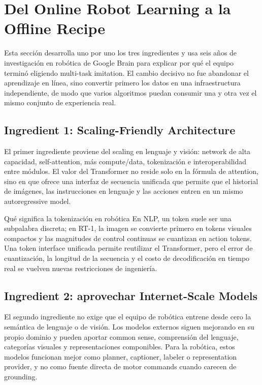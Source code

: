\section{Del Online Robot Learning a la Offline Recipe}

Esta sección desarrolla uno por uno los tres ingredientes y usa seis años de investigación en robótica de Google Brain para explicar por qué el equipo terminó eligiendo multi-task imitation. El cambio decisivo no fue abandonar el aprendizaje en línea, sino convertir primero los datos en una infraestructura independiente, de modo que varios algoritmos puedan consumir una y otra vez el mismo conjunto de experiencia real.

\subsection{Ingredient 1: Scaling-Friendly Architecture}

El primer ingrediente proviene del scaling en lenguaje y visión: network de alta capacidad, self-attention, más compute/data, tokenización e interoperabilidad entre módulos. El valor del Transformer no reside solo en la fórmula de attention, sino en que ofrece una interfaz de secuencia unificada que permite que el historial de imágenes, las instrucciones en lenguaje y las acciones entren en un mismo autoregressive model.


\begin{knowledgebox}{Qué significa la tokenización en robótica}
En NLP, un token suele ser una subpalabra discreta; en RT-1, la imagen se convierte primero en tokens visuales compactos y las magnitudes de control continuas se cuantizan en action tokens. Una token interface unificada permite reutilizar el Transformer, pero el error de cuantización, la longitud de la secuencia y el costo de decodificación en tiempo real se vuelven nuevas restricciones de ingeniería.
\end{knowledgebox}

\subsection{Ingredient 2: aprovechar Internet-Scale Models}

El segundo ingrediente no exige que el equipo de robótica entrene desde cero la semántica de lenguaje o de visión. Los modelos externos siguen mejorando en su propio dominio y pueden aportar common sense, comprensión del lenguaje, categorías visuales y representaciones componibles. Para la robótica, estos modelos funcionan mejor como planner, captioner, labeler o representation provider, y no como fuente directa de motor commands cuando carecen de grounding.

